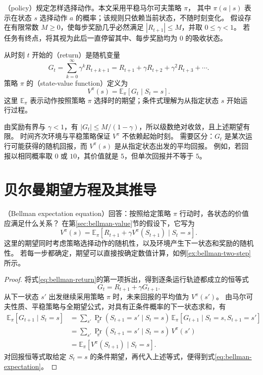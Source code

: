 \documentclass[UTF8]{ctexart}
\begin{document}
（policy）规定怎样选择动作。本文采用平稳马尔可夫策略 $\pi$，
其中 $\pi(a\mid s)$ 表示在状态 $s$ 选择动作 $a$ 的概率；该规则只依赖当前状态，不随时刻变化。
假设存在有限常数 $M\geq0$，使每步奖励几乎必然满足 $|R_{t+1}|\leq M$，并取 $0\leq\gamma<1$。
若任务有终点，将其视为此后一直停留其中、每步奖励均为 $0$ 的吸收状态。

\begin{definition}[回报与状态价值函数]
从时刻 $t$ 开始的（return）是随机变量
\begin{equation}
  G_t=\sum_{k=0}^{\infty}\gamma^k R_{t+k+1}
  =R_{t+1}+\gamma R_{t+2}+\gamma^2R_{t+3}+\cdots.
  \label{eq:bellman-return}
\end{equation}
策略 $\pi$ 的（state-value function）定义为
\begin{equation}
  V^\pi(s)=\mathbb E_\pi[G_t\mid S_t=s].
  \label{eq:bellman-value}
\end{equation}
这里 $\mathbb E_\pi$ 表示动作按照策略 $\pi$ 选择时的期望；条件式理解为从指定状态 $s$ 开始运行过程。
\end{definition}

由奖励有界与 $\gamma<1$，有 $|G_t|\leq M/(1-\gamma)$，所以级数绝对收敛，且上述期望有限。
时间齐次环境与平稳策略保证 $V^\pi$ 不依赖起始时刻。
需要区分：$G_t$ 是某次运行可能获得的随机回报，而 $V^\pi(s)$ 是从指定状态出发的平均回报。
例如，若回报以相同概率取 $0$ 或 $10$，其价值就是 $5$，但单次回报并不等于 $5$。

\section{贝尔曼期望方程及其推导}
\label{sec:bellman-expectation}

（Bellman expectation equation）回答：按照给定策略 $\pi$ 行动时，各状态的价值应满足什么关系？
在第\ref{sec:bellman-value}节的假设下，它写为
\begin{equation}
  \boxed{
  V^\pi(s)=\mathbb E_\pi\!\left[
    R_{t+1}+\gamma V^\pi(S_{t+1})\mid S_t=s
  \right].}
  \label{eq:bellman-expectation}
\end{equation}
这里的期望同时考虑策略选择动作的随机性，以及环境产生下一状态和奖励的随机性。
若每一步都确定，期望可以直接按确定数值计算，如例\ref{ex:bellman-two-step}所示。

\begin{proof}
将式\eqref{eq:bellman-return}的第一项拆出，得到逐条运行轨迹都成立的恒等式
\[
  G_t=R_{t+1}+\gamma G_{t+1}.
\]
从下一状态 $s'$ 出发继续采用策略 $\pi$ 时，未来回报的平均值为 $V^\pi(s')$。
由马尔可夫性质、平稳策略与全期望公式，对具有正条件概率的下一状态求和，有
\[
\begin{aligned}
  \mathbb E_\pi[G_{t+1}\mid S_t=s]
  &=\sum_{s'}\Pr_\pi(S_{t+1}=s'\mid S_t=s)\,
    \mathbb E_\pi[G_{t+1}\mid S_t=s,S_{t+1}=s']\\
  &=\sum_{s'}\Pr_\pi(S_{t+1}=s'\mid S_t=s)\,V^\pi(s')\\
  &=\mathbb E_\pi[V^\pi(S_{t+1})\mid S_t=s].
\end{aligned}
\]
对回报恒等式取给定 $S_t=s$ 的条件期望，再代入上述等式，便得到式\eqref{eq:bellman-expectation}。
\end{proof}
\end{document}
